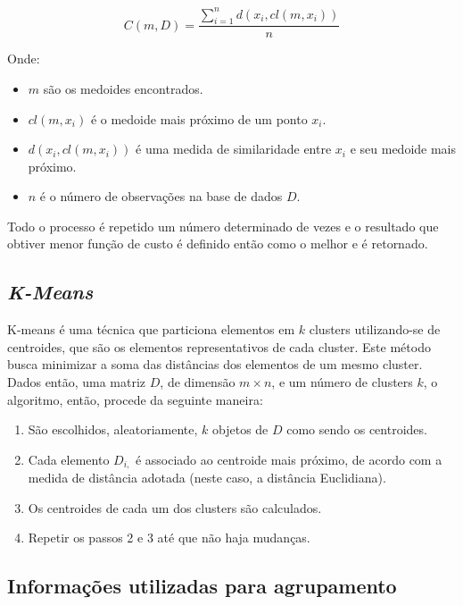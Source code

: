 \documentclass[12pt,a4paper,header]{abnt}
\begin{document}
\begin{equation}
C(m, D) = \frac{\sum_{i=1}^{n}{d(x_i, cl(m, x_i))}}{n}
\end{equation}

Onde:

\begin{itemize}

\item{$m$ são os medoides encontrados.}
\item{$cl(m,  x_i)$ é o medoide mais próximo de um ponto $x_i$.}
\item{$d(x_i, cl(m, x_i))$ é uma medida de similaridade entre $x_i$ e seu medoide mais próximo.}
\item{$n$ é o número de observações na base de dados $D$.}

\end{itemize}

Todo o processo é repetido um número determinado de vezes e o resultado que obtiver menor função de custo é definido então como o melhor e é retornado\cite{bhat2014k}.

\subsection{\textit{K-Means}}

K-means é uma técnica que particiona elementos em $k$ clusters utilizando-se de centroides, que são os elementos representativos de cada cluster. Este método busca minimizar a soma das distâncias dos elementos de um mesmo cluster. Dados então, uma matriz $D$, de dimensão $m \times n$, e um número de clusters $k$, o algoritmo, então, procede da seguinte maneira\cite{mining2006data}:

\begin{enumerate}

\item{São escolhidos, aleatoriamente, $k$ objetos de $D$ como sendo os centroides.}
\item{Cada elemento $D_{i,}$ é associado ao centroide mais próximo, de acordo com a medida de distância adotada (neste caso, a distância Euclidiana).}
\item{Os centroides de cada um dos clusters são calculados.}
\item{Repetir os passos 2 e 3 até que não haja mudanças.}

\end{enumerate}

\subsection{Informações utilizadas para agrupamento}
\end{document}
